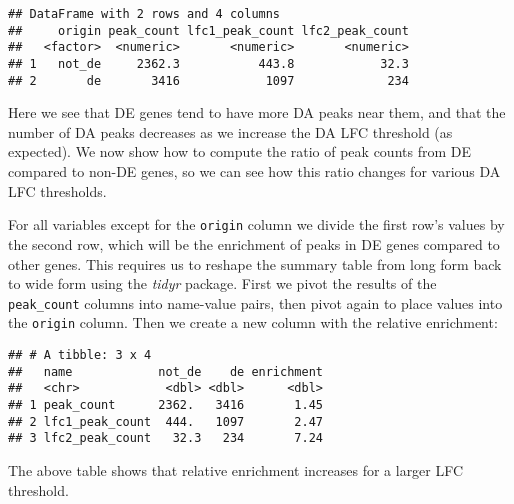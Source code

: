 \documentclass[
]{article}
\newenvironment{Shaded}{}{}
\newcommand{\DataTypeTok}[1]{\textcolor[rgb]{0.56,0.13,0.00}{#1}}
\newcommand{\KeywordTok}[1]{\textcolor[rgb]{0.00,0.44,0.13}{\textbf{#1}}}
\newcommand{\NormalTok}[1]{#1}
\newcommand{\OperatorTok}[1]{\textcolor[rgb]{0.40,0.40,0.40}{#1}}
\newcommand{\StringTok}[1]{\textcolor[rgb]{0.25,0.44,0.63}{#1}}
\begin{document}
\begin{verbatim}
## DataFrame with 2 rows and 4 columns
##     origin peak_count lfc1_peak_count lfc2_peak_count
##   <factor>  <numeric>       <numeric>       <numeric>
## 1   not_de     2362.3           443.8            32.3
## 2       de       3416            1097             234
\end{verbatim}

Here we see that DE genes tend to have more DA peaks near them, and that the
number of DA peaks decreases as we increase the DA LFC threshold (as expected).
We now show how to compute the ratio of peak counts from DE compared to non-DE
genes, so we can see how this ratio changes for various DA LFC thresholds.

For all variables except for the \texttt{origin} column we divide the first row's
values by the second row, which will be the enrichment of peaks in DE genes
compared to other genes. This requires us to reshape the summary table from long
form back to wide form using the \emph{tidyr} package. First we pivot the results of
the \texttt{peak\_count} columns into name-value pairs, then pivot again to place values
into the \texttt{origin} column. Then we create a new column with the relative
enrichment:

\begin{Shaded}
\end{Shaded}

\begin{verbatim}
## # A tibble: 3 x 4
##   name            not_de    de enrichment
##   <chr>            <dbl> <dbl>      <dbl>
## 1 peak_count      2362.   3416       1.45
## 2 lfc1_peak_count  444.   1097       2.47
## 3 lfc2_peak_count   32.3   234       7.24
\end{verbatim}

The above table shows that relative enrichment increases for a larger LFC
threshold.
\end{document}
